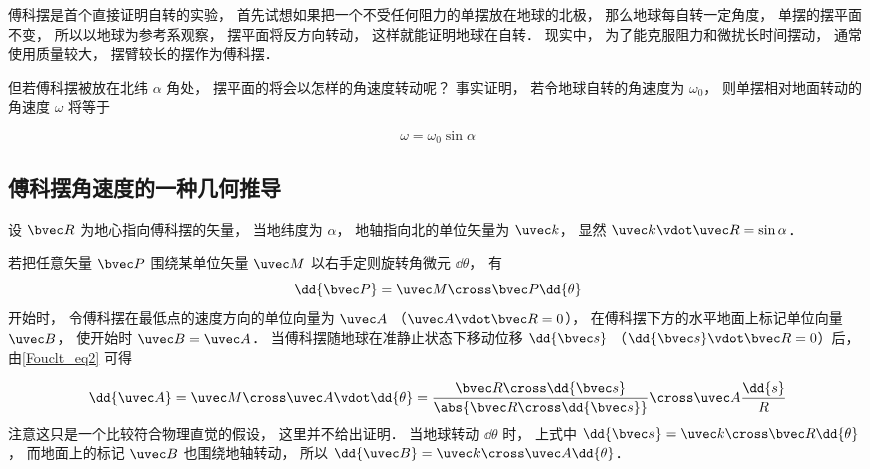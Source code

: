 
傅科摆是首个直接证明自转的实验， 首先试想如果把一个不受任何阻力的单摆放在地球的北极， 那么地球每自转一定角度， 单摆的摆平面不变， 所以以地球为参考系观察， 摆平面将反方向转动， 这样就能证明地球在自转． 现实中， 为了能克服阻力和微扰长时间摆动， 通常使用质量较大， 摆臂较长的摆作为傅科摆．

但若傅科摆被放在北纬 $\alpha$ 角处， 摆平面的将会以怎样的角速度转动呢？ 事实证明， 若令地球自转的角速度为 $\omega_0$， 则单摆相对地面转动的角速度 $\omega$ 将等于

\begin{equation}
\omega = \omega_0 \sin\alpha
\end{equation}

\subsection{傅科摆角速度的一种几何推导}
设 $\bvec R$ 为地心指向傅科摆的矢量， 当地纬度为 $\alpha$， 地轴指向北的单位矢量为 $\uvec k$， 显然 $\uvec k\vdot \uvec R = \sin\alpha$．

若把任意矢量 $\bvec P$ 围绕某单位矢量 $\uvec M$ 以右手定则旋转角微元 $\dd{\theta}$， 有
\begin{equation}\label{Fouclt_eq2}
\dd{\bvec P} = \uvec M \cross \bvec P \dd{\theta}
\end{equation}
开始时， 令傅科摆在最低点的速度方向的单位向量为 $\uvec A$ （$\uvec A\vdot \bvec R = 0$）， 在傅科摆下方的水平地面上标记单位向量 $\uvec B$， 使开始时 $\uvec B = \uvec A$． 当傅科摆随地球在准静止状态下移动位移 $\dd{\bvec s}$ （$\dd{\bvec s} \vdot\bvec R = 0$）后， 由\autoref{Fouclt_eq2} 可得

\begin{equation}
\dd{\uvec A} = \uvec M\cross \uvec A\vdot \dd{\theta} = 
\frac{\bvec R\cross \dd{\bvec s}}{\abs{\bvec R\cross \dd{\bvec s}}} \cross \uvec A \frac{\dd{s}}{R}
\end{equation}
注意这只是一个比较符合物理直觉的假设， 这里并不给出证明． 当地球转动 $\dd{\theta}$ 时， 上式中 $\dd{\bvec s} = \uvec k \cross \bvec R \dd{\theta}$， 而地面上的标记 $\uvec B$ 也围绕地轴转动， 所以 $\dd{\uvec B} = \uvec k \cross \uvec A \dd{\theta}$．


